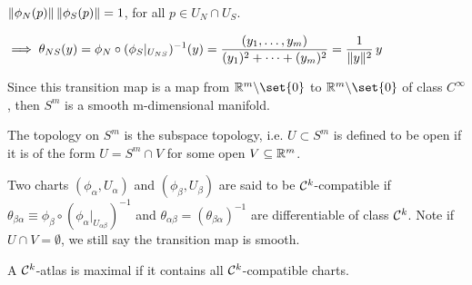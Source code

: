 \begin{example}
\begin{enumerate}[(1)]
		\begin{fact}
			$\lVert\phi_N(p)\rVert \,\lVert\phi_S(p)\rVert =1$, for all $p\in U_N \cap U_S$.
			
			$\displaystyle \implies \theta_{NS}(y) = {\phi_N \circ ({\phi_S}\rvert_{U_{NS}})^{-1}}(y) = 
			\frac{(y_1,\dots,y_m)}{(y_1)^2+\dots+(y_m)^2} = \frac{1}{\lVert y\rVert^2}\, y$

			Since this transition map is a map\footnotemark{} from $\bbR^m\backslash\set{0}$ to $\bbR^m\backslash\set{0}$ of class $C^\infty$, then $S^m$ is a smooth m-dimensional manifold.
		\end{fact}

		\begin{notabene}
			The topology on $S^m$ is the subspace topology, i.e. $U \subset S^m$ is defined to be open if it is of the form $U=S^m \cap V$ for some open $V\subseteq \mathbb R^m$.
		\end{notabene}
	
	\end{enumerate}
\end{example}

\begin{definition}
	Two charts $(\phi_\alpha, U_\alpha)$ and $(\phi_\beta, U_\beta)$ are said to be $\mathcal{C}^k$-compatible if $\theta_{\beta\alpha} \equiv {\phi_\beta \circ ({\phi_\alpha}\rvert_{U_{\alpha\beta}})^{-1}}$ and $\theta_{\alpha\beta} = (\theta_{\beta\alpha})^{-1}$ are differentiable of class $\mathcal{C}^k$. Note if $U\cap V = \emptyset$, we still say the transition map is smooth.
\end{definition}

\begin{definition}
	A $\mathcal{C}^k$-atlas is maximal if it contains all $\mathcal{C}^k$-compatible charts.
\end{definition}


